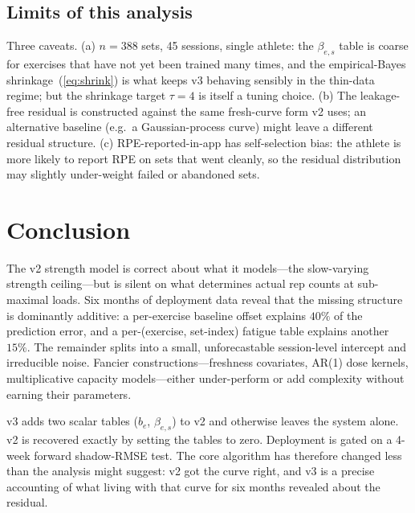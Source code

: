 \documentclass[11pt]{article}
\begin{document}
\subsection{Limits of this analysis}
Three caveats.
(a) $n=388$ sets, 45 sessions, single athlete: the $\beta_{e,s}$ table is coarse for exercises that have not yet been trained many times, and the empirical-Bayes shrinkage~(\ref{eq:shrink}) is what keeps v3 behaving sensibly in the thin-data regime; but the shrinkage target $\tau=4$ is itself a tuning choice.
(b) The leakage-free residual is constructed against the same fresh-curve form v2 uses; an alternative baseline (e.g.\ a Gaussian-process curve) might leave a different residual structure.
(c) RPE-reported-in-app has self-selection bias: the athlete is more likely to report RPE on sets that went cleanly, so the residual distribution may slightly under-weight failed or abandoned sets.

\section{Conclusion}
\label{sec:conclusion}

The v2 strength model is correct about what it models---the slow-varying strength ceiling---but is silent on what determines actual rep counts at sub-maximal loads.
Six months of deployment data reveal that the missing structure is dominantly additive: a per-exercise baseline offset explains $40\%$ of the prediction error, and a per-(exercise, set-index) fatigue table explains another $15\%$.
The remainder splits into a small, unforecastable session-level intercept and irreducible noise.
Fancier constructions---freshness covariates, AR(1) dose kernels, multiplicative capacity models---either under-perform or add complexity without earning their parameters.

v3 adds two scalar tables ($b_e$, $\beta_{e,s}$) to v2 and otherwise leaves the system alone.
v2 is recovered exactly by setting the tables to zero.
Deployment is gated on a 4-week forward shadow-RMSE test.
The core algorithm has therefore changed less than the analysis might suggest: v2 got the curve right, and v3 is a precise accounting of what living with that curve for six months revealed about the residual.

\printbibliography
\end{document}
